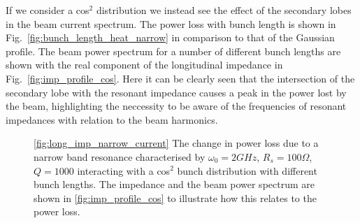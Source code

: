 If we consider a cos$^{2}$ distribution we instead see the effect of the secondary lobes in the beam current spectrum. The power loss with bunch length is shown in Fig.~\ref{fig:bunch_length_heat_narrow} in comparison to that of the Gaussian profile. The beam power spectrum for a number of different bunch lengths are shown with the real component of the longitudinal impedance in Fig.~\ref{fig:imp_profile_cos}. Here it can be clearly seen that the intersection of the secondary lobe with the resonant impedance causes a peak in the power lost by the beam, highlighting the neccessity to be aware of the frequencies of resonant impedances with relation to the beam harmonics.


\begin{figure}
\caption{\ref{fig:long_imp_narrow_current} The change in power loss due to a narrow band resonance characterised by $\omega_{0} = 2GHz$, $R_{s} = 100\Omega$, $Q = 1000$ interacting with a cos$^{2}$ bunch distribution with different bunch lengths. The impedance and the beam power spectrum are shown in \ref{fig:imp_profile_cos} to illustrate how this relates to the power loss.}
\end{figure}

